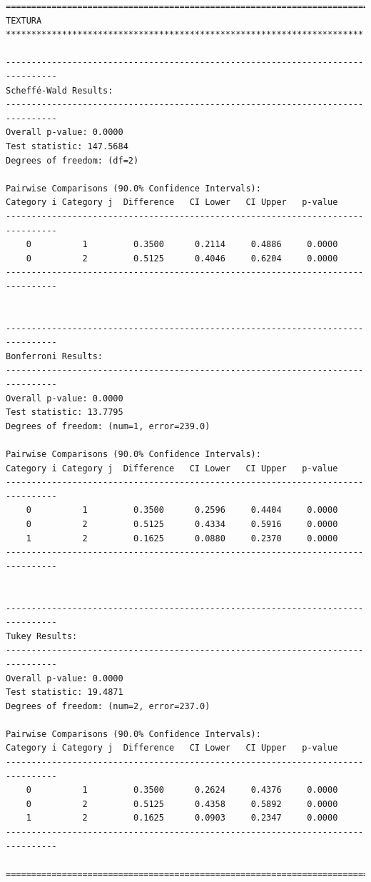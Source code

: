 \begin{lstlisting}
================================================================================
TEXTURA **********************************************************************

--------------------------------------------------------------------------------
Scheffé-Wald Results:
--------------------------------------------------------------------------------
Overall p-value: 0.0000
Test statistic: 147.5684
Degrees of freedom: (df=2)

Pairwise Comparisons (90.0% Confidence Intervals):
Category i Category j  Difference   CI Lower   CI Upper   p-value  
--------------------------------------------------------------------------------
    0          1         0.3500      0.2114     0.4886     0.0000  
    0          2         0.5125      0.4046     0.6204     0.0000  
--------------------------------------------------------------------------------


--------------------------------------------------------------------------------
Bonferroni Results:
--------------------------------------------------------------------------------
Overall p-value: 0.0000
Test statistic: 13.7795
Degrees of freedom: (num=1, error=239.0)

Pairwise Comparisons (90.0% Confidence Intervals):
Category i Category j  Difference   CI Lower   CI Upper   p-value  
--------------------------------------------------------------------------------
    0          1         0.3500      0.2596     0.4404     0.0000  
    0          2         0.5125      0.4334     0.5916     0.0000  
    1          2         0.1625      0.0880     0.2370     0.0000  
--------------------------------------------------------------------------------


--------------------------------------------------------------------------------
Tukey Results:
--------------------------------------------------------------------------------
Overall p-value: 0.0000
Test statistic: 19.4871
Degrees of freedom: (num=2, error=237.0)

Pairwise Comparisons (90.0% Confidence Intervals):
Category i Category j  Difference   CI Lower   CI Upper   p-value  
--------------------------------------------------------------------------------
    0          1         0.3500      0.2624     0.4376     0.0000  
    0          2         0.5125      0.4358     0.5892     0.0000  
    1          2         0.1625      0.0903     0.2347     0.0000  
--------------------------------------------------------------------------------

================================================================================
\end{lstlisting}

